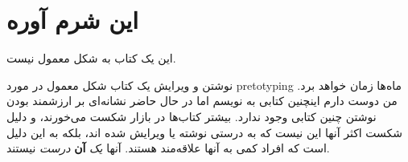 \section{این شرم
آوره}\label{ux627ux6ccux646-ux634ux631ux645-ux622ux648ux631ux647}

این یک کتاب به شکل معمول نیست.

نوشتن و ویرایش یک کتاب شکل معمول در مورد pretotyping ماه‌ها زمان خواهد
برد. من دوست دارم اینچنین کتابی به نویسم اما در حال حاضر نشانه‌ای بر
ارزشمند بودن نوشتن چنین کتابی وجود ندارد. بیشتر کتاب‌ها در بازار شکست
می‌خورند، و دلیل شکست اکثر آنها این نیست که به درستی نوشته یا ویرایش شده
اند، بلکه به این دلیل است که افراد کمی به آنها علاقه‌مند هستند. آنها
\emph{یک} \textbf{آن} \emph{درست} نیستند.
